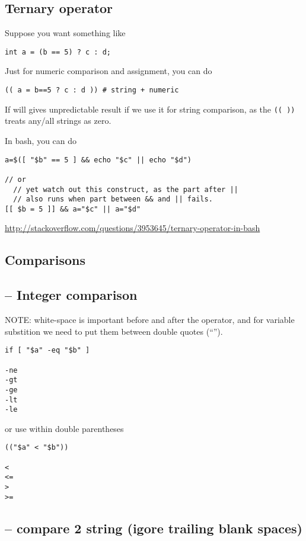 \subsection{Ternary operator}

Suppose you want something like
\begin{verbatim}
int a = (b == 5) ? c : d;
\end{verbatim}

Just for numeric comparison and assignment, you can do
\begin{verbatim}
(( a = b==5 ? c : d )) # string + numeric
\end{verbatim}
If will gives unpredictable result if we use it for string comparison, as the 
\verb!(( ))! treats any/all strings as zero.

In bash, you can do
\begin{verbatim}
a=$([ "$b" == 5 ] && echo "$c" || echo "$d")

// or  
  // yet watch out this construct, as the part after ||
  // also runs when part between && and || fails.
[[ $b = 5 ]] && a="$c" || a="$d"
\end{verbatim}


\url{http://stackoverflow.com/questions/3953645/ternary-operator-in-bash}

\subsection{Comparisons}

\subsection{-- Integer comparison}

NOTE: white-space is important before and after the operator, and for variable
substition we need to put them between double quotes (``'').

\begin{verbatim}
if [ "$a" -eq "$b" ]

-ne
-gt
-ge
-lt
-le
\end{verbatim}
or use within double parentheses
\begin{verbatim}
(("$a" < "$b"))

<
<=
>
>=
\end{verbatim}

\subsection{-- compare 2 string (igore trailing blank spaces)}

